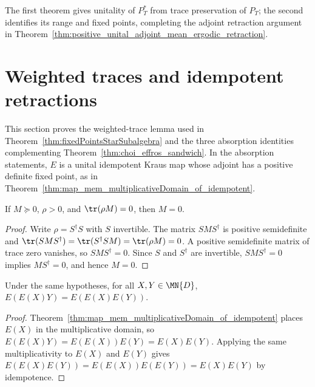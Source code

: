 The first theorem gives unitality of $P_T^*$ from trace preservation of $P_T$;
the second identifies its range and fixed points, completing the adjoint
retraction argument in
Theorem~\ref{thm:positive_unital_adjoint_mean_ergodic_retraction}.

\section{Weighted traces and idempotent retractions}

This section proves the weighted-trace lemma used in
Theorem~\ref{thm:fixedPointsStarSubalgebra} and the three absorption identities
complementing Theorem~\ref{thm:choi_effros_sandwich}. In the absorption
statements, $E$ is a unital idempotent Kraus map whose adjoint has a positive
definite fixed point, as in
Theorem~\ref{thm:map_mem_multiplicativeDomain_of_idempotent}.

\begin{lemma}
    \label{lem:posDef_weighted_trace_faithful}
    \leanok
    If $M\succeq0$, $\rho>0$, and $\tr(\rho M)=0$, then $M=0$.
\end{lemma}

\begin{proof}\leanok
    Write $\rho=S^\dagger S$ with $S$ invertible. The matrix
    $SMS^\dagger$ is positive semidefinite and
    $\tr(SMS^\dagger)=\tr(S^\dagger SM)=\tr(\rho M)=0$.
    A positive semidefinite matrix of trace zero vanishes, so
    $SMS^\dagger=0$. Since $S$ and $S^\dagger$ are invertible,
    $SMS^\dagger=0$ implies $MS^\dagger=0$, and hence $M=0$.
\end{proof}

\begin{theorem}
    \label{thm:choi_effros_left}
    \leanok
    Under the same hypotheses, for all $X,Y\in\MN{D}$,
    $E(E(X)Y)=E(E(X)E(Y))$.
\end{theorem}

\begin{proof}\leanok
    Theorem~\ref{thm:map_mem_multiplicativeDomain_of_idempotent} places
    $E(X)$ in the multiplicative domain, so
    $E(E(X)Y)=E(E(X))E(Y)=E(X)E(Y)$.
    Applying the same multiplicativity to $E(X)$ and $E(Y)$ gives
    $E(E(X)E(Y))=E(E(X))E(E(Y))=E(X)E(Y)$ by idempotence.
\end{proof}

